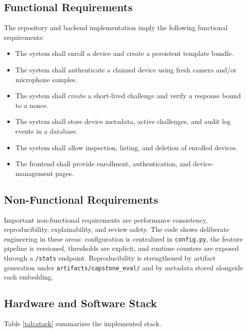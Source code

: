 \documentclass[12pt]{report}
\begin{document}
\subsection{Functional Requirements}
The repository and backend implementation imply the following functional requirements:
\begin{itemize}[leftmargin=1.2cm]
\item The system shall enroll a device and create a persistent template bundle.
\item The system shall authenticate a claimed device using fresh camera and/or microphone samples.
\item The system shall create a short-lived challenge and verify a response bound to a nonce.
\item The system shall store device metadata, active challenges, and audit log events in a database.
\item The system shall allow inspection, listing, and deletion of enrolled devices.
\item The frontend shall provide enrollment, authentication, and device-management pages.
\end{itemize}

\subsection{Non-Functional Requirements}
Important non-functional requirements are performance consistency, reproducibility, explainability, and review safety. The code shows deliberate engineering in these areas: configuration is centralized in \texttt{config.py}, the feature pipeline is versioned, thresholds are explicit, and runtime counters are exposed through a \texttt{/stats} endpoint. Reproducibility is strengthened by artifact generation under \texttt{artifacts/capstone\_eval/} and by metadata stored alongside each embedding.

\subsection{Hardware and Software Stack}
Table \ref{tab:stack} summarizes the implemented stack.
\end{document}
